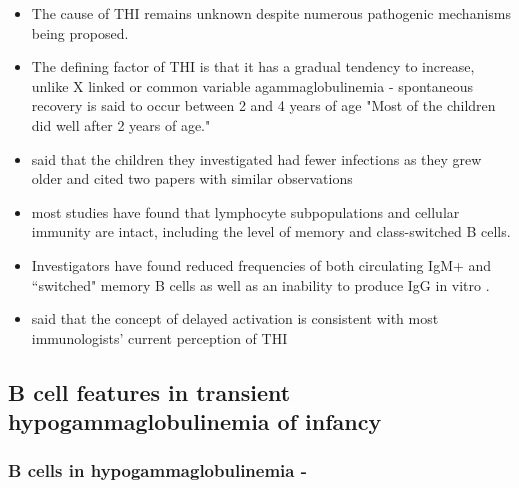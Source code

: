 \documentclass[12pt]{article}
\begin{document}
	\begin{itemize}
		
		\item The cause of THI remains unknown despite numerous pathogenic mechanisms being proposed.
		\begin{enumerate}
			
			
		\end{enumerate}
		\item The defining factor of THI is that it has a gradual tendency to increase, unlike X linked or common variable agammaglobulinemia - spontaneous recovery is said to occur between 2 and 4 years of age \citep{Tiller78} "Most of the children did well after 2 years of age." \citep{McGeady87}
		\item \citet{McGeady87} said that the children they investigated had fewer infections as they grew older and cited two papers with similar observations
		\item most studies have found that lymphocyte subpopulations and cellular immunity are intact, including the level of memory and class-switched B cells. 
		\item Investigators have found reduced frequencies of both circulating IgM+ and ``switched" memory B cells as well as an inability to produce IgG in vitro \citep{Ovadia14}.
		\item \citet{McGeady87} said that the concept of delayed activation is consistent with most immunologists' current perception of THI
	\end{itemize} 
	
	\subsection{B cell features in transient hypogammaglobulinemia of infancy}
	
	\subsubsection{B cells in hypogammaglobulinemia - \citeauthor{Fiorilli86} \citeyear{Fiorilli86}}
	
	
	
\end{document}

